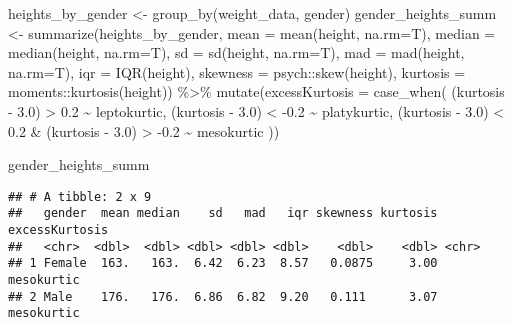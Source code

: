 \documentclass[
]{article}
\newenvironment{Shaded}{\begin{snugshade}}{\end{snugshade}}
\newcommand{\AttributeTok}[1]{\textcolor[rgb]{0.77,0.63,0.00}{#1}}
\newcommand{\FloatTok}[1]{\textcolor[rgb]{0.00,0.00,0.81}{#1}}
\newcommand{\FunctionTok}[1]{\textcolor[rgb]{0.00,0.00,0.00}{#1}}
\newcommand{\NormalTok}[1]{#1}
\newcommand{\OtherTok}[1]{\textcolor[rgb]{0.56,0.35,0.01}{#1}}
\newcommand{\SpecialCharTok}[1]{\textcolor[rgb]{0.00,0.00,0.00}{#1}}
\newcommand{\StringTok}[1]{\textcolor[rgb]{0.31,0.60,0.02}{#1}}
\begin{document}
\begin{Shaded}
\begin{Highlighting}[]
\NormalTok{heights\_by\_gender }\OtherTok{\textless{}{-}} \FunctionTok{group\_by}\NormalTok{(weight\_data, gender)}
\NormalTok{gender\_heights\_summ }\OtherTok{\textless{}{-}} \FunctionTok{summarize}\NormalTok{(heights\_by\_gender, }\AttributeTok{mean =} \FunctionTok{mean}\NormalTok{(height, }\AttributeTok{na.rm=}\NormalTok{T), }\AttributeTok{median =} \FunctionTok{median}\NormalTok{(height, }\AttributeTok{na.rm=}\NormalTok{T), }\AttributeTok{sd =} \FunctionTok{sd}\NormalTok{(height, }\AttributeTok{na.rm=}\NormalTok{T), }\AttributeTok{mad =} \FunctionTok{mad}\NormalTok{(height, }\AttributeTok{na.rm=}\NormalTok{T), }\AttributeTok{iqr =} \FunctionTok{IQR}\NormalTok{(height), }\AttributeTok{skewness =}\NormalTok{ psych}\SpecialCharTok{::}\FunctionTok{skew}\NormalTok{(height), }\AttributeTok{kurtosis =}\NormalTok{ moments}\SpecialCharTok{::}\FunctionTok{kurtosis}\NormalTok{(height)) }\SpecialCharTok{\%\textgreater{}\%}
  \FunctionTok{mutate}\NormalTok{(}\AttributeTok{excessKurtosis =} \FunctionTok{case\_when}\NormalTok{(}
\NormalTok{    (kurtosis }\SpecialCharTok{{-}} \FloatTok{3.0}\NormalTok{) }\SpecialCharTok{\textgreater{}} \FloatTok{0.2} \SpecialCharTok{\textasciitilde{}} \StringTok{\textquotesingle{}leptokurtic\textquotesingle{}}\NormalTok{,}
\NormalTok{    (kurtosis }\SpecialCharTok{{-}} \FloatTok{3.0}\NormalTok{) }\SpecialCharTok{\textless{}} \SpecialCharTok{{-}}\FloatTok{0.2} \SpecialCharTok{\textasciitilde{}} \StringTok{\textquotesingle{}platykurtic\textquotesingle{}}\NormalTok{,}
\NormalTok{    (kurtosis }\SpecialCharTok{{-}} \FloatTok{3.0}\NormalTok{) }\SpecialCharTok{\textless{}} \FloatTok{0.2} \SpecialCharTok{\&}\NormalTok{ (kurtosis }\SpecialCharTok{{-}} \FloatTok{3.0}\NormalTok{) }\SpecialCharTok{\textgreater{}} \SpecialCharTok{{-}}\FloatTok{0.2} \SpecialCharTok{\textasciitilde{}} \StringTok{\textquotesingle{}mesokurtic\textquotesingle{}}
\NormalTok{  ))}

\NormalTok{gender\_heights\_summ}
\end{Highlighting}
\end{Shaded}

\begin{verbatim}
## # A tibble: 2 x 9
##   gender  mean median    sd   mad   iqr skewness kurtosis excessKurtosis
##   <chr>  <dbl>  <dbl> <dbl> <dbl> <dbl>    <dbl>    <dbl> <chr>         
## 1 Female  163.   163.  6.42  6.23  8.57   0.0875     3.00 mesokurtic    
## 2 Male    176.   176.  6.86  6.82  9.20   0.111      3.07 mesokurtic
\end{verbatim}
\end{document}

